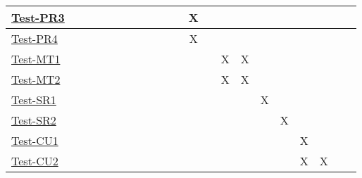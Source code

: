 \documentclass[12pt, titlepage]{article}
\begin{document}
\begin{landscape}
\begin{table}[H]
\begin{adjustwidth}{-0.3in}{-0.5in}
{\begin{tabular}{c|c|c|c|c|c|c|c|c|c|c|c|c|c|c|c|c|c|c|c|c|}
\multicolumn{1}{|l|}{\hyperref[itm:Test-PR3]{Test-PR3}}   &             &             &             &             &             &             &            &                           &              &              &      X        &             &             &             &     &   &&&&      \\ \hline
\multicolumn{1}{|l|}{\hyperref[itm:Test-PR4]{Test-PR4}}   &             &             &             &             &             &              &            &                           &              &              &      X        &             &             &             &     &   &&&&      \\ \hline
\multicolumn{1}{|l|}{\hyperref[itm:Test-MT1]{Test-MT1}}   &             &             &             &             &             &              &             &                           &              &              &             &              &      X       &      X      &         &&&&&     \\ \hline
\multicolumn{1}{|l|}{\hyperref[itm:Test-MT2]{Test-MT2}}   &                          &             &             &             &              &             &             &              &              &              &             &              &       X      &       X      &         &&&&&     \\ \hline
\multicolumn{1}{|l|}{\hyperref[itm:Test-SR1]{Test-SR1}}   &                          &             &             &             &              &             &             &              &              &              &             &              &             &             &    X     &&&&&     \\ \hline
\multicolumn{1}{|l|}{\hyperref[itm:Test-SR2]{Test-SR2}}   &             &             &             &             &             &              &             &             &              &              &              &             &              &             &             &         X&&&&     \\ \hline
\multicolumn{1}{|l|}{\hyperref[itm:Test-CU1]{Test-CU1}}   &             &             &             &             &             &              &             &             &              &              &              &             &              &             &             &         &X&&&     \\ \hline
\multicolumn{1}{|l|}{\hyperref[itm:Test-CU2]{Test-CU2}}   &             &             &             &             &             &              &             &             &              &              &              &             &              &             &             &         &X&X&&     \\ \hline

\end{tabular}}
\end{adjustwidth}
\end{table}
\end{landscape}
\end{document}

